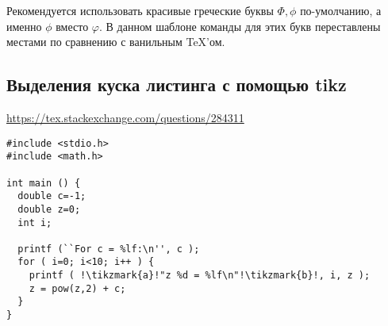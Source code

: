 Рекомендуется использовать красивые греческие буквы $\Phi,\phi$ по-умол\-ча\-нию, а именно $\phi$ вместо $\varphi$. В данном шаблоне команды для этих букв переставлены местами по сравнению с ванильным \TeX'ом.


\subsection{Выделения куска листинга с помощью tikz}
\url{https://tex.stackexchange.com/questions/284311}

\begin{lstlisting}[escapechar=!,basicstyle=\ttfamily]
#include <stdio.h>
#include <math.h>

int main () {
  double c=-1;
  double z=0;
  int i;

  printf (``For c = %lf:\n'', c );
  for ( i=0; i<10; i++ ) {
    printf ( !\tikzmark{a}!"z %d = %lf\n"!\tikzmark{b}!, i, z );
    z = pow(z,2) + c;
  }
}
\end{lstlisting}

